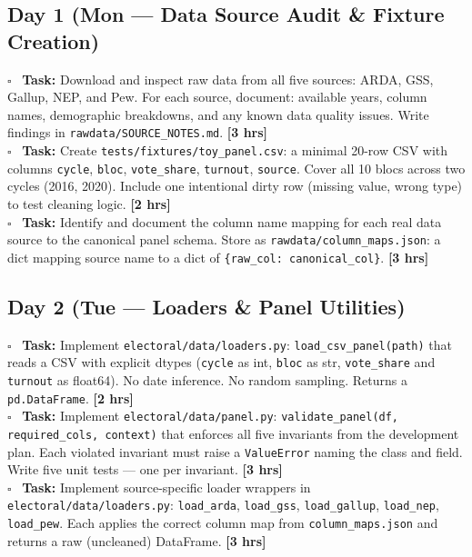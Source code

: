 \documentclass[11pt]{article}
\newcommand{\hrs}[1]{\textbf{[#1 hrs]}}
\newcommand{\dayhead}[2]{%
  \subsection*{Day #1 \normalfont\small\color{codegray}(#2)}}
\newcommand{\task}[2]{%
  \noindent\textbf{Task:} #1 \hfill \hrs{#2}\\}
\newcommand{\done}{\textcolor{sectionblue}{$\square$}\ }
\begin{document}
\dayhead{1}{Mon --- Data Source Audit \& Fixture Creation}

\begin{taskbox}
\done \task{Download and inspect raw data from all five sources: ARDA, GSS, Gallup,
  NEP, and Pew. For each source, document: available years, column names,
  demographic breakdowns, and any known data quality issues. Write findings in
  \texttt{rawdata/SOURCE\_NOTES.md}.}{3}

\done \task{Create \texttt{tests/fixtures/toy\_panel.csv}: a minimal 20-row CSV
  with columns \texttt{cycle}, \texttt{bloc}, \texttt{vote\_share}, \texttt{turnout},
  \texttt{source}. Cover all 10 blocs across two cycles (2016, 2020). Include one
  intentional dirty row (missing value, wrong type) to test cleaning logic.}{2}

\done \task{Identify and document the column name mapping for each real data source
  to the canonical panel schema. Store as \texttt{rawdata/column\_maps.json}:
  a dict mapping source name to a dict of \texttt{\{raw\_col: canonical\_col\}}.}{3}
\end{taskbox}

\dayhead{2}{Tue --- Loaders \& Panel Utilities}

\begin{taskbox}
\done \task{Implement \texttt{electoral/data/loaders.py}: \texttt{load\_csv\_panel(path)}
  that reads a CSV with explicit dtypes (\texttt{cycle} as int, \texttt{bloc} as str,
  \texttt{vote\_share} and \texttt{turnout} as float64). No date inference.
  No random sampling. Returns a \texttt{pd.DataFrame}.}{2}

\done \task{Implement \texttt{electoral/data/panel.py}: \texttt{validate\_panel(df,
  required\_cols, context)} that enforces all five invariants from the development
  plan. Each violated invariant must raise a \texttt{ValueError} naming the
  class and field. Write five unit tests --- one per invariant.}{3}

\done \task{Implement source-specific loader wrappers in \texttt{electoral/data/loaders.py}:
  \texttt{load\_arda}, \texttt{load\_gss}, \texttt{load\_gallup}, \texttt{load\_nep},
  \texttt{load\_pew}. Each applies the correct column map from
  \texttt{column\_maps.json} and returns a raw (uncleaned) DataFrame.}{3}
\end{taskbox}
\end{document}
